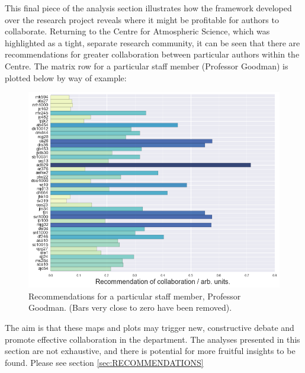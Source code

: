 This final piece of the analysis section illustrates how the framework developed over the research project reveals where it might be profitable for authors to collaborate. Returning to the Centre for Atmospheric Science, which was highlighted as a tight, separate research community, it can be seen that there are recommendations for greater collaboration between particular authors within the Centre. The matrix row for a particular staff member (Professor Goodman) is plotted below by way of example:
\begin{center}
\begin{figure}[H]
\label{fig:RECOMM_MAT}
  \centering
    \includegraphics[scale=0.8]{Analysis/jmg.png}
    \caption{Recommendations for a particular staff member, Professor Goodman. (Bars very close to zero have been removed). }
\end{figure} 
\end{center}
The aim is that these maps and plots may trigger new, constructive debate and promote effective collaboration in the department. The analyses presented in this section are not exhaustive, and there is potential for more fruitful insights to be found. Please see section \ref{sec:RECOMMENDATIONS}

